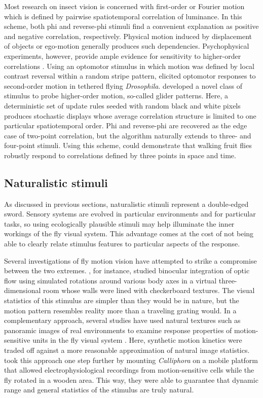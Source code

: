 Most research on insect vision is concerned with first-order or Fourier motion which is defined by pairwise spatiotemporal correlation of luminance. In this scheme, both phi and reverse-phi stimuli find a convenient explanation as positive and negative correlation, respectively. Physical motion induced by displacement of objects or ego-motion generally produces such dependencies. Psychophysical experiments, however, provide ample evidence for sensitivity to higher-order correlations \citep{Lu:2001vf}. Using an optomotor stimulus in which motion was defined by local contrast reversal within a random stripe pattern, \citet{Theobald:2008et} elicited optomotor responses to second-order motion in tethered flying \textit{Drosophila}. \citet{Hu:2010gx} developed a novel class of stimulus to probe higher-order motion, so-called glider patterns. Here, a deterministic set of update rules seeded with random black and white pixels produces stochastic displays whose average correlation structure is limited to one particular spatiotemporal order. Phi and reverse-phi are recovered as the edge case of two-point correlation, but the algorithm naturally extends to three- and four-point stimuli. Using this scheme, \citet{Clark:2014aa} could demonstrate that walking fruit flies robustly respond to correlations defined by three points in space and time.

\subsection{Naturalistic stimuli}
As discussed in previous sections, naturalistic stimuli represent a double-edged sword. Sensory systems are evolved in particular environments and for particular tasks, so using ecologically plausible stimuli may help illuminate the inner workings of the fly visual system. This advantage comes at the cost of not being able to clearly relate stimulus features to particular aspects of the response.

Several investigations of fly motion vision have attempted to strike a compromise between the two extremes. \citet{Wertz:2009hb}, for instance, studied binocular integration of optic flow using simulated rotations around various body axes in a virtual three-dimensional room whose walls were lined with checkerboard textures. The visual statistics of this stimulus are simpler than they would be in nature, but the motion pattern resembles reality more than a traveling grating would. In a complementary approach, several studies have used natural textures such as panoramic images of real environments to examine response properties of motion-sensitive units in the fly visual system \citep{Straw:2008hh,OCarroll:2011gj}. Here, synthetic motion kinetics were traded off against a more reasonable approximation of natural image statistics. \citet{Lewen:2001tz} took this approach one step further by mounting \textit{Calliphora} on a mobile platform that allowed electrophysiological recordings from motion-sensitive cells while the fly rotated in a wooden area. This way, they were able to guarantee that dynamic range and general statistics of the stimulus are truly natural.

